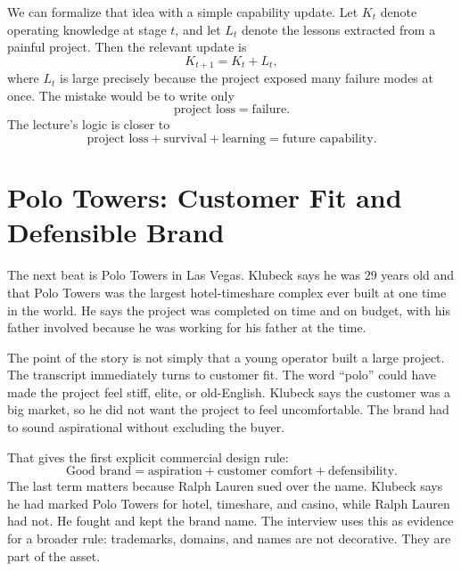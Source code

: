We can formalize that idea with a simple capability update. Let \(K_t\) denote operating knowledge at stage \(t\), and let \(L_t\) denote the lessons extracted from a painful project. Then the relevant update is
\begin{equation}
K_{t+1}=K_t+L_t,
\end{equation}
where \(L_t\) is large precisely because the project exposed many failure modes at once. The mistake would be to write only
\[
\text{project loss}=\text{failure}.
\]
The lecture's logic is closer to
\[
\text{project loss}+\text{survival}+\text{learning}
=
\text{future capability}.
\]

\section{Polo Towers: Customer Fit and Defensible Brand}

The next beat is Polo Towers in Las Vegas. Klubeck says he was \(29\) years old and that Polo Towers was the largest hotel-timeshare complex ever built at one time in the world. He says the project was completed on time and on budget, with his father involved because he was working for his father at the time.

The point of the story is not simply that a young operator built a large project. The transcript immediately turns to customer fit. The word ``polo'' could have made the project feel stiff, elite, or old-English. Klubeck says the customer was a big market, so he did not want the project to feel uncomfortable. The brand had to sound aspirational without excluding the buyer.

That gives the first explicit commercial design rule:
\begin{equation}
\text{Good brand}
=
\text{aspiration}
+
\text{customer comfort}
+
\text{defensibility}.
\end{equation}
The last term matters because Ralph Lauren sued over the name. Klubeck says he had marked Polo Towers for hotel, timeshare, and casino, while Ralph Lauren had not. He fought and kept the brand name. The interview uses this as evidence for a broader rule: trademarks, domains, and names are not decorative. They are part of the asset.

